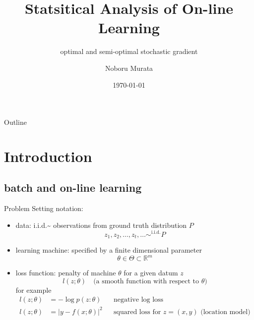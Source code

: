 \documentclass[fleqn,aspectratio=1610]{beamer}
\author{Noboru Murata}
\date{\today}
\title{Statsitical Analysis of On-line Learning}
\subtitle{optimal and semi-optimal stochastic gradient}
\institute{\url{https://noboru-murata.github.io/}}
\begin{document}
\maketitle
\begin{frame}{Outline}
\tableofcontents
\end{frame}

\section{Introduction}
\label{sec:org109b612}
\subsection{batch and on-line learning}
\label{sec:org44c293b}
\begin{frame}[label={sec:org238637a}]{Problem Setting}
notation:
\begin{itemize}
\item data: 
i.i.d.\textasciitilde{} observations from ground truth distribution \(P\)
\begin{equation}
  z_{1},z_{2},\dotsc,z_{t},\dotsc \sim^{\mathrm{i.i.d.}} P 
\end{equation}
\item learning machine:
specified by a finite dimensional parameter
\begin{equation}
  \theta \in \Theta\subset \mathbb{R}^{m}
\end{equation}
\item loss function:
penalty of machine \(\theta\) for a given datum \(z\) 
\begin{equation}
  l(z;\theta)
  \quad\text{(a smooth function with respect to \(\theta\))}
\end{equation}
for example
\begin{align}
  l(z;\theta)&=-\log p(z:\theta)
  &&\text{negative log loss}\\[-2pt]
  l(z;\theta)&=|y-f(x;\theta)|^{2}
  &&\text{squared loss for \(z=(x,y)\) (location model)}
\end{align}
\end{itemize}
\end{frame}
\end{document}
